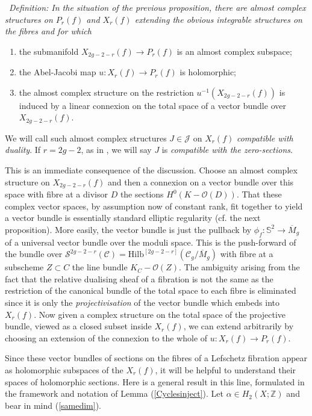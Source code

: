 \documentclass[10pt]{article}
\newcommand{\zz}{\mathbb{Z}}
\newcommand{\sss}{\mathbb{S}}
\newcommand{\mgbar}{\overline{M}_g}
\newcommand{\Hilb}{\mathrm{Hilb}}
\newcounter{Universal}[section]
\renewcommand{\theUniversal}{\thesection.\arabic{Universal}}
\newenvironment{Italic}{\refstepcounter{Universal} \par \vspace{0.5cm}
\noindent {\bf (\theUniversal)}\ \it}{\par \vspace{0.5cm}}
\newenvironment{Defn}{\begin{Italic}{\sc Definition: } }{\end{Italic}}
\newcounter{enum}
\begin{document}
\begin{Defn}
In the situation of the previous proposition, there are almost complex
structures on $P_r(f)$ and $X_r(f)$ extending the obvious integrable
structures on the fibres and for which
\begin{enumerate}
\item the submanifold $X_{2g-2-r}(f) \rightarrow P_r(f)$ is an almost
complex subspace;
\item the Abel-Jacobi map $u:X_r(f) \rightarrow P_r(f)$ is holomorphic;
\item the almost complex structure on the restriction $u^{-1}
  (X_{2g-2-r}(f))$ is induced by a linear connexion on the total space
  of a vector bundle over $X_{2g-2-r}(f)$.
\end{enumerate}
We will call such almost complex structures $J \in \mathcal{J}$ on $X_r(f)$
\emph{compatible with duality}.  If $r=2g-2$, as in \cite{SKDIS}, we
will say $J$ is \emph{compatible with the zero-sections}.
\end{Defn}

\noindent This is an immediate consequence of the discussion.  Choose
an almost complex structure on $X_{2g-2-r}(f)$ and then a
connexion on a vector bundle over this space with fibre at a divisor
$D$ the sections $H^0(K-\mathcal{O}(D))$.  That these complex vector spaces,
by assumption now of constant rank, fit together to yield a vector
bundle is essentially standard elliptic regularity (cf. the next
proposition).  More easily,
the vector bundle is just the pullback by $\phi_f: \sss^2 \rightarrow
\mgbar$ of a universal vector bundle over the moduli space.  This is
the push-forward of the bundle over $\mathcal{S}^{2g-2-r}(\mathcal{C})
= \Hilb^{[2g-2-r]}(\mathcal{C}_g /
\mgbar)$ with fibre at a subscheme $Z \subset C$ the line bundle $K_C
- \mathcal{O}(Z)$.  The ambiguity arising from the fact that the
relative dualising sheaf of a fibration is not the same as the
restriction of the canonical bundle of the total space to each fibre
is eliminated since it is only the \emph{projectivisation} of the
vector bundle which embeds into $X_r(f)$.  Now given a complex
structure on the total space of the projective bundle, viewed as a
closed subset inside $X_r(f)$, we can extend arbitrarily by choosing
an extension of the connexion to the whole of $u: X_r(f) \rightarrow P_r(f)$.

\vspace{0.2cm}

\noindent Since these vector bundles of sections on the fibres of a
Lefschetz fibration appear as holomorphic subspaces of the $X_r(f)$,
it will be helpful to understand their spaces of holomorphic sections.
Here is a general result in this line, formulated
in the framework and notation of Lemma (\ref{Cyclesinject}).
Let $\alpha \in H_2(X;\zz)$ and bear in mind (\ref{samedim}).
\end{document}
